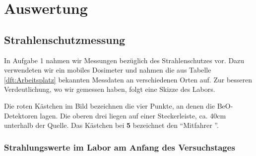 \section{Auswertung}

\subsection{Strahlenschutzmessung}

In Aufgabe 1 nahmen wir Messungen bezüglich des Strahlenschutzes vor. Dazu verwendeten wir ein mobiles Dosimeter und nahmen die aus Tabelle \ref{dft:Arbeitsplatz} bekannten Messdaten an verschiedenen Orten auf. Zur besseren Verdeutlichung, wo wir gemessen haben, folgt eine Skizze des Labors.

\vspace{5mm}

\begin{center}
    \minipanf    
        \label{fig:skizze}
    \minipend
\end{center}

\vspace{5mm}

Die roten Kästchen im Bild bezeichnen die vier Punkte, an denen die BeO-Detektoren lagen. Die oberen drei liegen auf einer Steckerleiste, ca. 40cm unterhalb der Quelle. Das Kästchen bei \textbf{5} bezeichnet den \textquotedblleft Mitfahrer \textquotedblright.

\subsubsection{Strahlungswerte im Labor am Anfang des Versuchstages}

